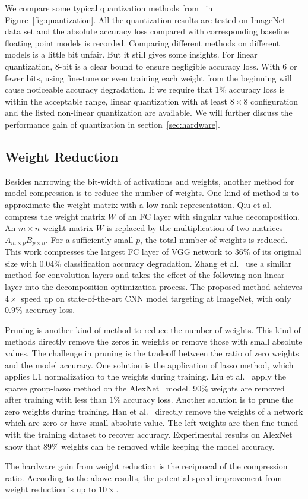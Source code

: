 We compare some typical quantization methods from~\cite{qiu2016going, guo2017angel, han2015deep, zhu2016trained, zhou2016dorefa, li2016ternary} in Figure~\ref{fig:quantization}. All the quantization results are tested on ImageNet data set and the absolute accuracy loss compared with corresponding baseline floating point models is recorded. Comparing different methods on different models is a little bit unfair. But it still gives some insights. For linear quantization, 8-bit is a clear bound to ensure negligible accuracy loss. With 6 or fewer bits, using fine-tune or even training each weight from the beginning will cause noticeable accuracy degradation. If we require that $1\%$ accuracy loss is within the acceptable range, linear quantization with at least $8\times 8$ configuration and the listed non-linear quantization are available. We will further discuss the performance gain of quantization in section~\ref{sec:hardware}. 


\subsection{Weight Reduction}\label{sec:software:wr}
Besides narrowing the bit-width of activations and weights, another method for model compression is to reduce the number of weights. One kind of method is to approximate the weight matrix with a low-rank representation. Qiu et al.~\cite{qiu2016going} compress the weight matrix $W$ of an FC layer with singular value decomposition. An $m\times n$ weight matrix $W$ is replaced by the multiplication of two matrices $A_{m\times p}B_{p\times n}$. For a sufficiently small $p$, the total number of weights is reduced. This work compresses the largest FC layer of VGG network to $36\%$ of its original size with $0.04\%$ classification accuracy degradation. Zhang et al.~\cite{zhang2015efficient} use a similar method for convolution layers and takes the effect of the following non-linear layer into the decomposition optimization process. The proposed method achieves $4\times$ speed up on state-of-the-art CNN model targeting at ImageNet, with only $0.9\%$ accuracy loss.

Pruning is another kind of method to reduce the number of weights. This kind of methods directly remove the zeros in weights or remove those with small absolute values. The challenge in pruning is the tradeoff between the ratio of zero weights and the model accuracy. One solution is the application of lasso method, which applies L1 normalization to the weights during training. Liu et al.~\cite{liu2015sparse} apply the sparse group-lasso method on the AlexNet~\cite{krizhevsky2012imagenet} model. $90\%$ weights are removed after training with less than $1\%$ accuracy loss. Another solution is to prune the zero weights during training. Han et al.~\cite{han2015deep} directly remove the weights of a network which are zero or have small absolute value. The left weights are then fine-tuned with the training dataset to recover accuracy. Experimental results on AlexNet show that $89\%$ weights can be removed while keeping the model accuracy.

The hardware gain from weight reduction is the reciprocal of the compression ratio. According to the above results, the potential speed improvement from weight reduction is up to $10\times$.